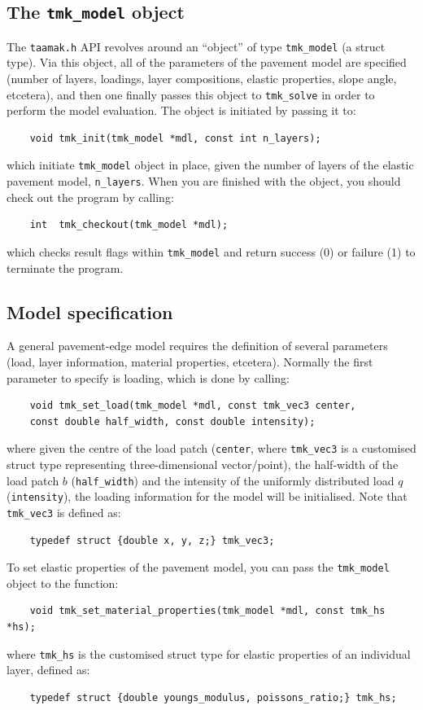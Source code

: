 \documentclass{article}
\begin{document}
\subsection{The \texttt{tmk\_model} object}
The \texttt{taamak.h} API revolves around an ``object'' of type \texttt{tmk\_model} (a struct type). Via this object, all of the parameters of the pavement model are specified (number of layers, loadings, layer compositions, elastic properties, slope angle, etcetera), and then one finally passes this object to \texttt{tmk\_solve} in order to perform the model evaluation. The object is initiated by passing it to:
\begin{lstlisting}
    void tmk_init(tmk_model *mdl, const int n_layers);
\end{lstlisting}
which initiate \texttt{tmk\_model} object in place, given the number of layers of the elastic pavement model, \texttt{n\_layers}. When you are finished with the object, you should check out the program by calling:
\begin{lstlisting}
    int  tmk_checkout(tmk_model *mdl);
\end{lstlisting}
which checks result flags within \texttt{tmk\_model} and return success (0) or failure (1) to terminate the program. 

\subsection{Model specification}
A general pavement-edge model requires the definition of several parameters (load, layer information, material properties, etcetera). Normally the first parameter to specify is loading, which is done by calling:
\begin{lstlisting}
    void tmk_set_load(tmk_model *mdl, const tmk_vec3 center, 
    const double half_width, const double intensity);
\end{lstlisting}
where given the centre of the load patch (\texttt{center}, where \texttt{tmk\_vec3} is a customised struct type representing three-dimensional vector/point), the half-width of the load patch \( b \) (\texttt{half\_width}) and the intensity of the uniformly distributed load \( q \) (\texttt{intensity}), the loading information for the model will be initialised. Note that \texttt{tmk\_vec3} is defined as:
\begin{lstlisting}
    typedef struct {double x, y, z;} tmk_vec3;
\end{lstlisting}

To set elastic properties of the pavement model, you can pass the \texttt{tmk\_model} object to the function:
\begin{lstlisting}
    void tmk_set_material_properties(tmk_model *mdl, const tmk_hs *hs);
\end{lstlisting}
where \texttt{tmk\_hs} is the customised struct type for elastic properties of an individual layer, defined as:
\begin{lstlisting}
    typedef struct {double youngs_modulus, poissons_ratio;} tmk_hs;
\end{lstlisting}
\end{document}
